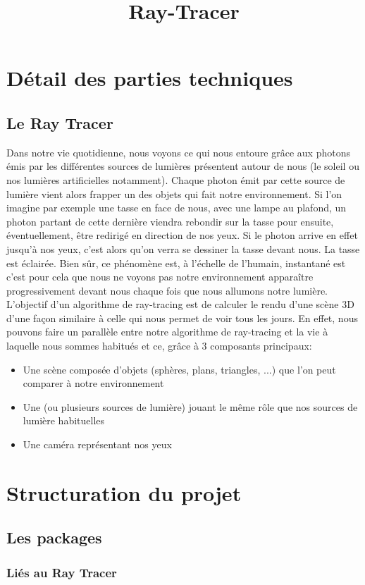 \documentclass[11pt]{article}
\author{}
\title{Ray-Tracer}
\date{}
\begin{document}
\maketitle

\section{Détail des parties techniques}
\subsection{Le Ray Tracer}
Dans notre vie quotidienne, nous voyons ce qui nous entoure grâce aux photons émis par les différentes sources de lumières présentent autour de nous (le soleil ou nos lumières artificielles notamment). Chaque photon émit par cette source de lumière vient alors frapper un des objets qui fait notre environnement. Si l'on imagine par exemple une tasse en face de nous, avec une lampe au plafond, un photon partant de cette dernière viendra rebondir sur la tasse pour ensuite, éventuellement, être redirigé en direction de nos yeux. Si le photon arrive en effet jusqu'à nos yeux, c'est alors qu'on verra se dessiner la tasse devant nous. La tasse est éclairée. Bien sûr, ce phénomène est, à l'échelle de l'humain, instantané est c'est pour cela que nous ne voyons pas notre environnement apparaître progressivement devant nous chaque fois que nous allumons notre lumière. 
L'objectif d'un algorithme de ray-tracing est de calculer le rendu d'une scène 3D d'une façon similaire à celle qui nous permet de voir tous les jours. En effet, nous pouvons faire un parallèle entre notre algorithme de ray-tracing et la vie à laquelle nous sommes habitués et ce, grâce à 3 composants principaux:
\begin{itemize}
	\item{Une scène composée d'objets (sphères, plans, triangles, ...) que l'on peut comparer à notre environnement}
	\item{Une (ou plusieurs sources de lumière) jouant le même rôle que nos sources de lumière habituelles}
	\item{Une caméra représentant nos yeux}
\end{itemize}


\section{Structuration du projet}
\subsection{Les packages}
\subsubsection{Liés au Ray Tracer}
\end{document}
